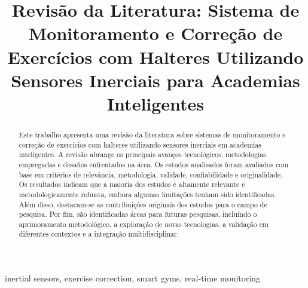 \documentclass[conference]{IEEEtran}
\begin{document}
\title{Revisão da Literatura: Sistema de Monitoramento e Correção de Exercícios com Halteres Utilizando Sensores Inerciais para Academias Inteligentes\\
}

\author{
\and
{}
\and
{}
}

\maketitle

\begin{abstract}
    Este trabalho apresenta uma revisão da literatura sobre sistemas de monitoramento e correção de exercícios com halteres utilizando sensores inerciais em academias inteligentes. A revisão abrange os principais avanços tecnológicos, metodologias empregadas e desafios enfrentados na área. Os estudos analisados foram avaliados com base em critérios de relevância, metodologia, validade, confiabilidade e originalidade. Os resultados indicam que a maioria dos estudos é altamente relevante e metodologicamente robusta, embora algumas limitações tenham sido identificadas. Além disso, destacam-se as contribuições originais dos estudos para o campo de pesquisa. Por fim, são identificadas áreas para futuras pesquisas, incluindo o aprimoramento metodológico, a exploração de novas tecnologias, a validação em diferentes contextos e a integração multidisciplinar.
\end{abstract}

\begin{IEEEkeywords}
    inertial sensors, exercise correction, smart gyms, real-time monitoring
\end{IEEEkeywords}
\end{document}
